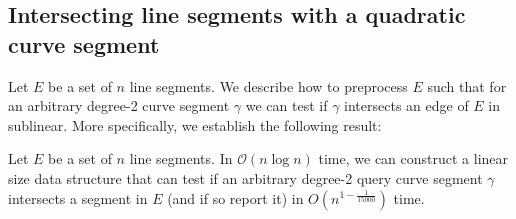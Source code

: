 \documentclass[UKenglish]{lipics-v2019}
\newcommand{\mkmcal}[1]{\ensuremath{\mathcal{#1}}\xspace}
\renewcommand{\O}{\mkmcal{O}}
\begin{document}
\subsection{Intersecting line segments with a quadratic curve segment}
\label{sub:intersecting_line_segments_with_a_quadratic__curve_segment}

Let $E$ be a set of $n$ line segments. We describe how to preprocess
$E$ such that for an arbitrary degree-2 curve segment $\gamma$ we can
test if $\gamma$ intersects an edge of $E$ in sublinear. More
specifically, we establish the following result:

\begin{lemma}
  \label{lemma:15000}
  Let $E$ be a set of $n$ line segments. In $\O(n\log n)$ time, we can
  construct a linear size data structure that can test if an arbitrary
  degree-2 query curve segment $\gamma$ intersects a segment in $E$
  (and if so report it) in $O(n^{1-\frac{1}{15 000}})$ time.
\end{lemma}



\end{document}
